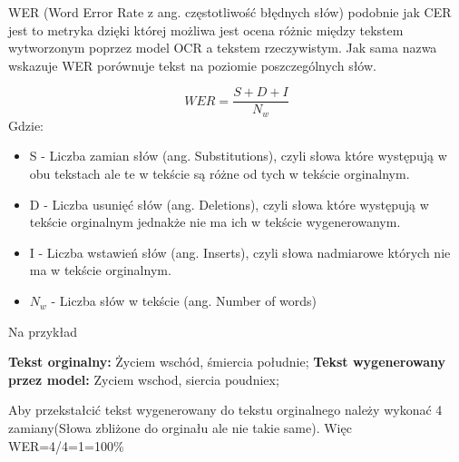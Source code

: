 \label{sec:WER}
WER (Word Error Rate z ang. częstotliwość błędnych słów) podobnie jak CER jest to metryka dzięki której możliwa 
jest ocena różnic między tekstem wytworzonym poprzez model OCR a tekstem rzeczywistym. Jak sama nazwa wskazuje
WER porównuje tekst na poziomie poszczególnych słów. 

\[
    WER=\frac{S+D+I}{N_w}
\]
Gdzie:
\begin{itemize}
    \item S - Liczba zamian słów (ang. Substitutions), czyli słowa które występują w obu tekstach ale te w tekście
        są różne od tych w tekście orginalnym.
    \item D - Liczba usunięć słów (ang. Deletions), czyli słowa które występują w tekście orginalnym jednakże nie ma
        ich w tekście wygenerowanym.
    \item I - Liczba wstawień słów (ang. Inserts), czyli słowa nadmiarowe których nie ma w tekście orginalnym.
    \item $N_w$ - Liczba słów w tekście (ang. Number of words)
\end{itemize}

Na przykład \linebreak

    \textbf{Tekst orginalny: }Życiem wschód, śmiercia południe; \linebreak
    \textbf{Tekst wygenerowany przez model: }Zyciem wschod, siercia poudniex; \linebreak

Aby przekstałcić tekst wygenerowany do tekstu orginalnego należy wykonać 4 zamiany(Słowa zbliżone do orginału ale nie takie same).
Więc WER=4/4=1=100\%
